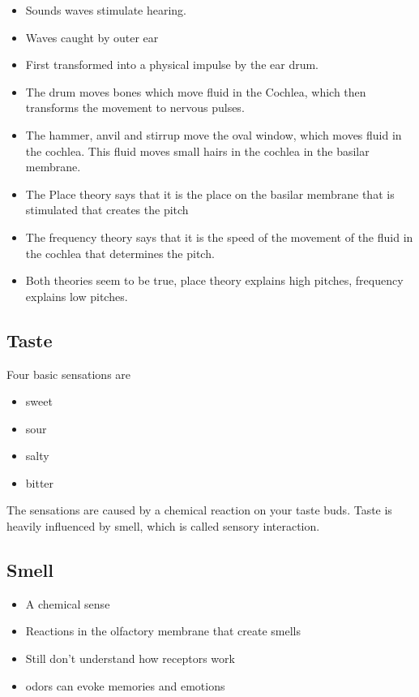 \documentclass[12pt]{article}
\begin{document}
\begin{itemize}
    \item Sounds waves stimulate hearing.
    \item Waves caught by outer ear
    \item First transformed into a physical impulse by the ear drum.
    \item The drum moves bones which move fluid in the Cochlea, which then
        transforms the movement to nervous pulses.
    \item The hammer, anvil and stirrup move the oval window, which moves fluid
        in the cochlea. This fluid moves small hairs in the cochlea in the
        basilar membrane.
    \item The Place theory says that it is the place on the basilar membrane
        that is stimulated that creates the pitch
    \item The frequency theory says that it is the speed of the movement of the
        fluid in the cochlea that determines the pitch.
    \item Both theories seem to be true, place theory explains high pitches,
        frequency explains low pitches.
\end{itemize}

\subsection{Taste}

Four basic sensations are
\begin{itemize}
    \item sweet
    \item sour
    \item salty
    \item bitter
\end{itemize}

The sensations are caused by a chemical reaction on your taste buds. Taste is
heavily influenced by smell, which is called sensory interaction.

\subsection{Smell}

\begin{itemize}
    \item A chemical sense
    \item Reactions in the olfactory membrane that create smells
    \item Still don't understand how receptors work
    \item odors can evoke memories and emotions
\end{itemize}
\end{document}
